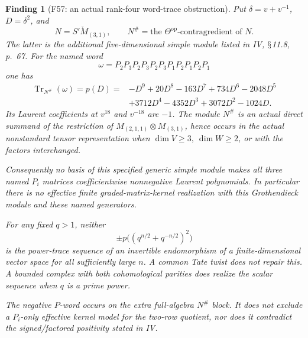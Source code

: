 \documentclass[11pt,a4paper]{article}
\renewcommand{\S}{\ensuremath{\mathsection}}
\newcommand{\fid}[1]{\textsf{#1}}\newcommand{\gate}[1]{\textsf{#1}}
\theoremstyle{named}\newtheorem{finding}{Finding}[section]
\theoremstyle{definition}\newtheorem{definition}[finding]{Definition}
\theoremstyle{remark}\newtheorem{remark}[finding]{Remark}
\begin{document}
\begin{finding}[\fid{F57}: an actual rank-four word-trace obstruction]
\label{f:rankfournegativetrace}
Put \(\delta=v+v^{-1}\), \(D=\delta^2\), and
\[
 N=S'\check M_{(3,1)},\qquad
 N^\#=\text{the }\Theta^{\mathrm{op}}\text{-contragredient of }N.
\]
The latter is the additional five-dimensional simple module listed
in IV, \S11.8, p.~67. For the named word
\[
 \omega=P_2P_3P_2P_3P_2P_3P_1P_2P_1P_2P_1
\]
one has
\begin{equation}\label{eq:rankfournegativepolynomial}
\begin{split}
 \operatorname{Tr}_{N^\#}(\omega)=p(D)
 ={}&-D^9+20D^8-163D^7+734D^6-2048D^5\\
    &+3712D^4-4352D^3+3072D^2-1024D.
\end{split}
\end{equation}
Its Laurent coefficients at \(v^{18}\) and \(v^{-18}\) are \(-1\).
The module \(N^\#\) is an actual direct summand of the restriction
of \(M_{(2,1,1)}\otimes M_{(3,1)}\), hence occurs in the actual
nonstandard tensor representation when
\(\dim V\ge3,\ \dim W\ge2\), or with the factors interchanged.

Consequently no basis of this specified generic simple module
makes all three named \(P_i\) matrices coefficientwise nonnegative
Laurent polynomials. In particular there is no effective finite
graded-matrix-kernel realization with this Grothendieck module
and these named generators.

For any fixed \(q>1\), neither
\[
 \pm p\big((q^{n/2}+q^{-n/2})^2\big)
\]
is the power-trace sequence of an invertible endomorphism of a
finite-dimensional vector space for all sufficiently large \(n\).
A common Tate twist does not repair this. A bounded complex
with both cohomological parities does realize the scalar sequence
when \(q\) is a prime power.

The negative \(P\)-word occurs on the extra full-algebra
\(N^\#\) block. It does not exclude a \(P_i\)-only effective
kernel model for the two-row quotient, nor does it contradict
the signed/factored positivity stated in IV.
\end{finding}
\end{document}
